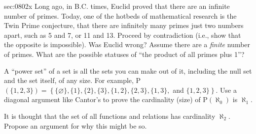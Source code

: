 \begin{exercises}{sec:0802x}
\prob[0802Primes] Long ago, in B.C. times, Euclid proved that there are an infinite 
number of primes.  Today, one of the hotbeds of mathematical research is the 
Twin Prime conjecture, that there are infinitely many primes just two numbers apart, 
such as 5 and 7, or 11 and 13.  Proceed by contradiction (i.e., show that the opposite
is impossible).  Was Euclid wrong?  Assume there are a \emph{finite} number of primes.
What are the possible statuses of ``the product of all primes plus 1''?


\prob[0802Power] A ``power set'' of a set is all the sets you can make out of it, including 
the null set and the set itself, of any size.  For example, P$(\{1,2,3\}) = \left\{\{\varnothing\}, 
\{1\}, \{2\}, \{3\}, \{1,2\}, \{2,3\}, \{1,3\},\right.$ and $\left.\{1,2,3\}\right\}$.
Use a diagonal argument like Cantor's to prove the cardinality (size) of 
P$(\aleph_0)$ is $\aleph_1$.


\prob[0802Aleph2] It is thought that the set of all functions and relations has 
cardinality $\aleph_2$.  Propose an argument for why this might be so.


\end{exercises}